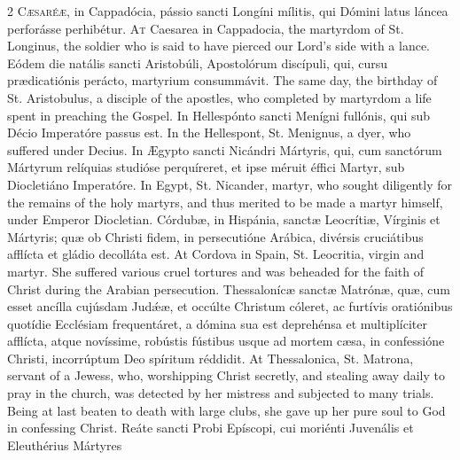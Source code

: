 \begin{paracol}{2}
\lettrine[lines=2]{C}{æsaréæ,} in Cappadócia, pássio sancti Longíni 
 mílitis, qui Dómini latus láncea perforásse perhibétur.
\switchcolumn
{}
\lettrine[lines=2]{A}{t} Caesarea in Cappadocia, the martyrdom of St. Longinus, the soldier who is 
 said to have pierced our Lord's side with a lance.
\switchcolumn*
{}
Eódem die natális sancti Aristobúli, 
 Apostolórum discípuli, qui, cursu prædicatiónis perácto, martyrium 
 consummávit.
\switchcolumn
{}
The same day, the birthday of St. Aristobulus, a disciple of the apostles, 
 who completed by martyrdom a life spent in preaching the Gospel.
\switchcolumn*
{}
In Hellespónto sancti Menígni fullónis, qui sub Décio Imperatóre passus est.
\switchcolumn
{}
In the Hellespont, St. Menignus, a dyer, who suffered under Decius.
\switchcolumn*
{}
In Ægypto sancti Nicándri Mártyris, qui, cum 
 sanctórum Mártyrum relíquias studióse perquíreret, et ipse méruit éffici 
 Martyr, sub Diocletiáno Imperatóre.
\switchcolumn
{}
In Egypt, St. Nicander, martyr, who sought diligently for the remains of the 
 holy martyrs, and thus merited to be made a martyr himself, under Emperor 
 Diocletian.
\switchcolumn*
{}
Córdubæ, in Hispánia, sanctæ Leocrítiæ, 
 Vírginis et Mártyris; quæ ob Christi fidem, in persecutióne Arábica, 
 divérsis cruciátibus afflícta et gládio decolláta est.
\switchcolumn
{}
At Cordova in Spain, St. Leocritia, virgin and martyr. She suffered 
 various cruel tortures and was beheaded for the faith of Christ during the 
 Arabian persecution.
\switchcolumn*
{}
Thessalonícæ sanctæ Matrónæ, quæ, cum esset 
 ancílla cujúsdam Judǽæ, et occúlte Christum cóleret, ac furtívis oratiónibus 
 quotídie Ecclésiam frequentáret, a dómina sua est deprehénsa et 
 multiplíciter afflícta, atque novíssime, robústis fústibus usque ad mortem 
 cæsa, in confessióne Christi, incorrúptum Deo spíritum réddidit.
\switchcolumn
{}
At Thessalonica, St. Matrona, servant of a Jewess, who, worshipping Christ 
 secretly, and stealing away daily to pray in the church, was detected by her 
 mistress and subjected to many trials. Being at last beaten to death 
 with large clubs, she gave up her pure soul to God in confessing Christ.
\switchcolumn*
{}
Reáte sancti Probi Epíscopi, cui moriénti Juvenális et Eleuthérius Mártyres 

\end{paracol}
